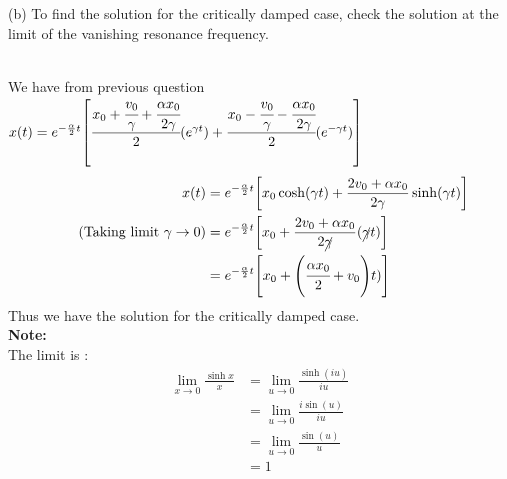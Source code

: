 \documentclass[addpoints]{exam}
\begin{document}
\begin{questions}
(b) To find the solution for the critically damped case, check the solution at the limit of the 
vanishing resonance frequency.
\begin{solution}\\
    We have from previous question $ x(t) = e^{-\frac{\alpha}{2}t}\qty[\cfrac{x_0 + \cfrac{v_0}{\gamma}+\cfrac{\alpha x_0}{2\gamma}}{2}\qty(e^{\gamma t}) +\cfrac{x_0 - \cfrac{v_0}{\gamma}-\cfrac{\alpha x_0}{2\gamma}}{2}\qty(e^{-\gamma t})]$
        \begin{align*}
            x(t) &= e^{-\frac{\alpha}{2}t}\qty[x_0 \cosh(\gamma t) + \frac{2v_0 + \alpha x_0}{2\gamma}\sinh(\gamma t)]\\ 
            \tag{Taking limit $\gamma \rightarrow0$}
                 &= e^{-\frac{\alpha}{2}t}\qty[x_0 + \frac{2v_0+\alpha x_0}{2\cancel{\gamma}}(\cancel{\gamma} t)]\\ 
                 &= e^{-\frac{\alpha}{2}t}\qty[x_0 +\qty( \cfrac{\alpha x_0}{2}+ v_0) t)]\\ 
        \end{align*}
        Thus we have the solution for the critically damped case.
        \\ 
        \textbf{Note:} \\ 
        The limit is : \begin{align*}\lim_{x\to 0} \frac{\sinh x}{x} &= \lim_{u\to 0} \frac{\sinh (iu)}{iu}\tag{Let $x=iu$} \\ &= \lim_{u\to 0} \frac{i\sin (u)}{iu} \\ &= \lim_{u\to 0} \frac{\sin (u)}{u} \\ &=1\end{align*}
\end{solution}


\end{questions}
\end{document}
